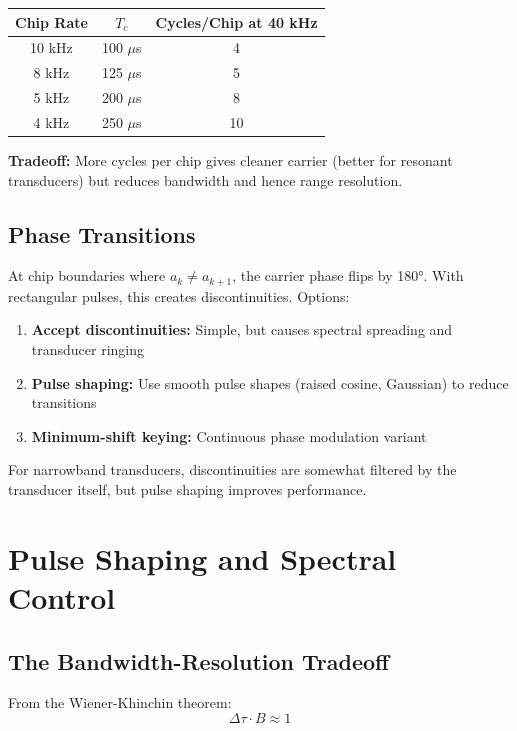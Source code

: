 \documentclass[11pt]{article}
\begin{document}
\begin{center}
\begin{tabular}{ccc}
\toprule
Chip Rate & $T_c$ & Cycles/Chip at 40 kHz \\
\midrule
10 kHz & 100 $\mu$s & 4 \\
8 kHz & 125 $\mu$s & 5 \\
5 kHz & 200 $\mu$s & 8 \\
4 kHz & 250 $\mu$s & 10 \\
\bottomrule
\end{tabular}
\end{center}

\textbf{Tradeoff:} More cycles per chip gives cleaner carrier (better for resonant transducers) but reduces bandwidth and hence range resolution.

\subsection{Phase Transitions}

At chip boundaries where $a_k \neq a_{k+1}$, the carrier phase flips by 180°. With rectangular pulses, this creates discontinuities. Options:
\begin{enumerate}
    \item \textbf{Accept discontinuities:} Simple, but causes spectral spreading and transducer ringing
    \item \textbf{Pulse shaping:} Use smooth pulse shapes (raised cosine, Gaussian) to reduce transitions
    \item \textbf{Minimum-shift keying:} Continuous phase modulation variant
\end{enumerate}

For narrowband transducers, discontinuities are somewhat filtered by the transducer itself, but pulse shaping improves performance.

\section{Pulse Shaping and Spectral Control}

\subsection{The Bandwidth-Resolution Tradeoff}

From the Wiener-Khinchin theorem:
\begin{equation}
\Delta\tau \cdot B \approx 1
\end{equation}
\end{document}
